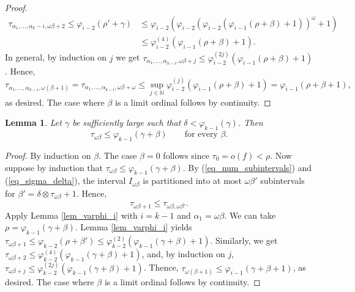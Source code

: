 \documentclass{article}
\newtheorem{Lemma}[Theorem]{Lemma}
\theoremstyle{definition}
\newcommand{\N}{\mathbb N}
\begin{document}
\begin{proof}
    \begin{align*}
        \tau_{\alpha_1,\ldots,\alpha_k-i,\omega\beta+2}\le \varphi_{i-2}(\rho'+\gamma)&\le \varphi_{i-2}(\varphi_{i-2}(\varphi_{i-2}(\varphi_{i-1}(\rho+\beta)+1))^\omega+1)\\&\le\varphi_{i-2}^{(4)}(\varphi_{i-1}(\rho+\beta)+1).
    \end{align*}
    In general, by induction on $j$ we get $\tau_{\alpha_1,\ldots,\alpha_{k-i},\omega\beta+j}\le\varphi_{i-2}^{(2j)}(\varphi_{i-1}(\rho+\beta)+1)$. Hence,
    \begin{equation*}
        \tau_{\alpha_1,\ldots,\alpha_{k-i},\omega(\beta+1)}=\tau_{\alpha_1,\ldots,\alpha_{k-i},\omega\beta+\omega}\le\sup_{j\in\N}\varphi_{i-2}^{(j)}(\varphi_{i-1}(\rho+\beta)+1)=\varphi_{i-1}(\rho+\beta+1),
    \end{equation*}
    as desired. The case where $\beta$ is a limit ordinal follows by continuity.
\end{proof}

\begin{Lemma}\label{lem_varphi_k}
    Let $\gamma$ be sufficiently large such that $\delta<\varphi_{k-1}(\gamma)$. Then
    \begin{equation*}
        \tau_{\omega\beta}\le\varphi_{k-1}(\gamma+\beta)\qquad\text{for every $\beta$.}
    \end{equation*}
\end{Lemma}

\begin{proof}
    By induction on $\beta$. The case $\beta=0$ follows since $\tau_0=o(f)<\rho$. Now suppose by induction that $\tau_{\omega\beta}\le\varphi_{k-1}(\gamma+\beta)$. By (\ref{eq_num_subintervals}) and (\ref{eq_sigma_delta}), the interval $I_{\omega\beta}$ is partitioned into at most $\omega\beta'$ subintervals for $\beta'=\delta\otimes\tau_{\omega\beta}+1$. Hence,
    \begin{equation*}
    \tau_{\omega\beta+1}\le\tau_{\omega\beta,\omega\beta'}.
    \end{equation*}
    Apply Lemma \ref{lem_varphi_i} with $i=k-1$ and $\alpha_1=\omega\beta$. We can take $\rho=\varphi_{k-1}(\gamma+\beta)$. Lemma \ref{lem_varphi_i} yields $\tau_{\omega\beta+1}\le \varphi_{k-2}(\rho+\beta')\le \varphi_{k-2}^{(2)}(\varphi_{k-1}(\gamma+\beta)+1)$. Similarly, we get $\tau_{\omega\beta+2}\le\varphi_{k-2}^{(4)}(\varphi_{k-1}(\gamma+\beta)+1)$, and, by induction on $j$, $\tau_{\omega\beta+j}\le\varphi_{k-2}^{(2j)}(\varphi_{k-1}(\gamma+\beta)+1)$. Thence, $\tau_{\omega(\beta+1)}\le\varphi_{i-1}(\gamma+\beta+1)$, as desired. The case where $\beta$ is a limit ordinal follows by continuity.
\end{proof}
\end{document}
